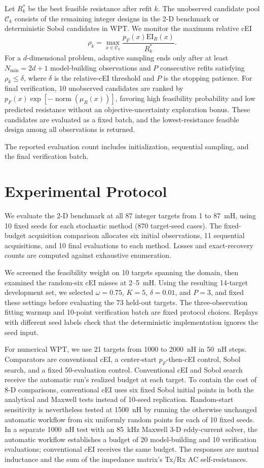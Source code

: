 \documentclass[10pt,conference,letterpaper]{IEEEtran}
\begin{document}
Let $R_k^*$ be the best feasible resistance after refit $k$. The unobserved candidate pool $\mathcal C_k$ consists of the remaining integer designs in the 2-D benchmark or deterministic Sobol candidates in WPT. We monitor the maximum relative cEI
\begin{equation}
 \rho_k=\max_{x\in\mathcal C_k}
 \frac{p_F(x)\mathrm{EI}_R(x)}{R_k^*}.
 \label{eq:stop}
\end{equation}
For a $d$-dimensional problem, adaptive sampling ends only after at least $N_{\min}=2d+1$ model-building observations and $P$ consecutive refits satisfying $\rho_k\leq\delta$, where $\delta$ is the relative-cEI threshold and $P$ is the stopping patience. For final verification, 10 unobserved candidates are ranked by $p_F(x)\exp[-\operatorname{norm}(\mu_R(x))]$, favoring high feasibility probability and low predicted resistance without an objective-uncertainty exploration bonus. These candidates are evaluated as a fixed batch, and the lowest-resistance feasible design among all observations is returned.

The reported evaluation count includes initialization, sequential sampling, and the final verification batch.

\section{Experimental Protocol}
We evaluate the 2-D benchmark at all 87 integer targets from 1 to 87~mH, using 10 fixed seeds for each stochastic method (870 target-seed cases). The fixed-budget acquisition comparison allocates six initial observations, 11 sequential acquisitions, and 10 final evaluations to each method. Losses and exact-recovery counts are computed against exhaustive enumeration.

We screened the feasibility weight on 10 targets spanning the domain, then examined the random-six cEI misses at 2--5~mH. Using the resulting 14-target development set, we selected $\omega=0.75$, $K=5$, $\delta=0.01$, and $P=3$, and fixed these settings before evaluating the 73 held-out targets. The three-observation fitting warmup and 10-point verification batch are fixed protocol choices. Replays with different seed labels check that the deterministic implementation ignores the seed input.

For numerical WPT, we use 21 targets from 1000 to 2000~nH in 50~nH steps. Comparators are conventional cEI, a center-start $p_F$-then-cEI control, Sobol search, and a fixed 50-evaluation control. Conventional cEI and Sobol search receive the automatic run's realized budget at each target. To contain the cost of 8-D comparisons, conventional cEI uses six fixed Sobol initial points in both the analytical and Maxwell tests instead of 10-seed replication. Random-start sensitivity is nevertheless tested at 1500~nH by running the otherwise unchanged automatic workflow from six uniformly random points for each of 10 fixed seeds. In a separate 1000~nH test with an 85~kHz Maxwell 3-D eddy-current solver, the automatic workflow establishes a budget of 20 model-building and 10 verification evaluations; conventional cEI receives the same budget. The responses are mutual inductance and the sum of the impedance matrix's Tx/Rx AC self-resistances.
\end{document}
